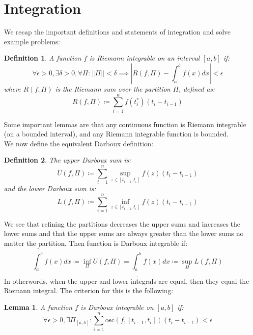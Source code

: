 \documentclass[10pt,letterpaper]{article} %
\newtheorem{lem}{Lemma}[section]
\newtheorem{defn}{Definition}[section]
\begin{document}
\section{Integration}
We recap the important definitions and statements of integration and solve example problems:
\begin{defn}
A function $f$ is Riemann integrable on an interval $[a, b]$ if:
\begin{equation*}
\forall \epsilon > 0, \exists \delta > 0, \forall \Pi: ||\Pi|| < \delta \implies \left|R(f, \Pi) - \int_{a}^{b}f(x)dx\right| < \epsilon
\end{equation*}
where $R(f, \Pi)$ is the Riemann sum over the partition $\Pi$, defined as:
\begin{equation*}
R(f, \Pi) \coloneq \sum_{i=1}^{n}f(t_i^*)(t_i - t_{i-1})
\end{equation*}
\end{defn}

Some important lemmas are that any continuous function is Riemann integrable (on a bounded interval), and any Riemann integrable function is bounded.\\

We now define the equivalent Darboux definition:
\begin{defn}
The upper Darboux sum is:
\begin{equation*}
U(f, \Pi) \coloneq \sum_{i=1}^{n}\sup_{z \in [t_{i-1}, t_i]}f(z)(t_i - t_{i-1})
\end{equation*}
and the lower Darboux sum is:
\begin{equation*}
L(f, \Pi) \coloneq \sum_{i=1}^{n}\inf_{z \in [t_{i-1}, t_i]}f(z) (t_i - t_{i-1})
\end{equation*}
\end{defn}
We see that refining the partitions decreases the upper sums and increases the lower sums and that the upper sums are always greater than the lower sums no matter the partition. Then function is Darboux integrable if:
\begin{equation*}
\overline{\int_{a}^{b}}f(x)dx \coloneq \inf_\Pi U(f, \Pi) = \underline{\int_{a}^{b}}f(x)dx \coloneq \sup_\Pi L(f, \Pi)
\end{equation*}
In otherwords, when the upper and lower integrals are equal, then they equal the Riemann integral. The criterion for this is the following:
\begin{lem}
A function $f$ is Darboux integrable on $[a, b]$ if:
\begin{equation*}
\forall \epsilon > 0, \exists \Pi_{[a, b]}: \sum_{i=1}^{n}\text{osc}(f, [t_{i-1}, t_i])(t_i - t_{i-1}) < \epsilon
\end{equation*}
\end{lem}
\end{document}
